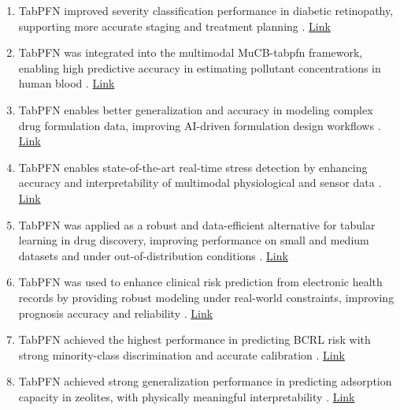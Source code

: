 \begin{enumerate}
\item TabPFN improved severity classification performance in diabetic retinopathy, supporting more accurate staging and treatment planning \cite{fang2026multitask}. \href{https://www.sciencedirect.com/science/article/pii/S1572100026001225}{Link}

\item TabPFN was integrated into the multimodal MuCB-tabpfn framework, enabling high predictive accuracy in estimating pollutant concentrations in human blood \cite{liu2026mucbtabpfn}. \href{https://www.sciencedirect.com/science/article/pii/S0147651326003842}{Link}

\item TabPFN enables better generalization and accuracy in modeling complex drug formulation data, improving AI-driven formulation design workflows \cite{zhong2026physicsbased}. \href{https://www.sciencedirect.com/science/article/pii/S0168365926002622}{Link}

\item TabPFN enables state-of-the-art real-time stress detection by enhancing accuracy and interpretability of multimodal physiological and sensor data \cite{githubGitHubRishabhmannuMultiModalStressDetectionML}. \href{https://github.com/Rishabhmannu/MultiModal-Stress-Detection-ML}{Link}

\item TabPFN was applied as a robust and data-efficient alternative for tabular learning in drug discovery, improving performance on small and medium datasets and under out-of-distribution conditions \cite{chen2026tabpfn}. \href{https://doi.org/10.1021/acs.jcim.5c02823}{Link}

\item TabPFN was used to enhance clinical risk prediction from electronic health records by providing robust modeling under real-world constraints, improving prognosis accuracy and reliability \cite{pham2026retrievalaligned}. \href{https://doi.org/10.21203/rs.3.rs-9085469/v1}{Link}

\item TabPFN achieved the highest performance in predicting BCRL risk with strong minority-class discrimination and accurate calibration \cite{sadek2026from}. \href{https://doi.org/10.1186/s12874-026-02805-4}{Link}


\item TabPFN achieved strong generalization performance in predicting adsorption capacity in zeolites, with physically meaningful interpretability \cite{johnsson2026predicting}. \href{https://doi.org/10.1021/acs.jpcc.5c08611}{Link}


\end{enumerate}
